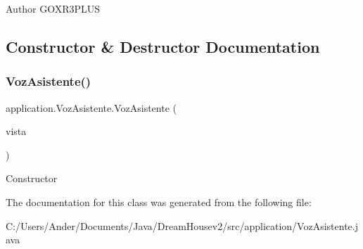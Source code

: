 \begin{DoxyAuthor}{Author}
G\+O\+X\+R3\+P\+L\+US 
\end{DoxyAuthor}


\subsection{Constructor \& Destructor Documentation}
\mbox{\label{classapplication_1_1_voz_asistente_abbcb08ba9e4c065c9c40c2d0e554808b}} 
\subsubsection{\texorpdfstring{Voz\+Asistente()}{VozAsistente()}}
{\footnotesize\ttfamily application.\+Voz\+Asistente.\+Voz\+Asistente (\begin{DoxyParamCaption}\item[{\mbox{\hyperlink{classvista_1_1_ventana_principal}{Ventana\+Principal}}}]{vista }\end{DoxyParamCaption})}

Constructor 

The documentation for this class was generated from the following file\+:\begin{DoxyCompactItemize}
\item 
C\+:/\+Users/\+Ander/\+Documents/\+Java/\+Dream\+Housev2/src/application/Voz\+Asistente.\+java\end{DoxyCompactItemize}
